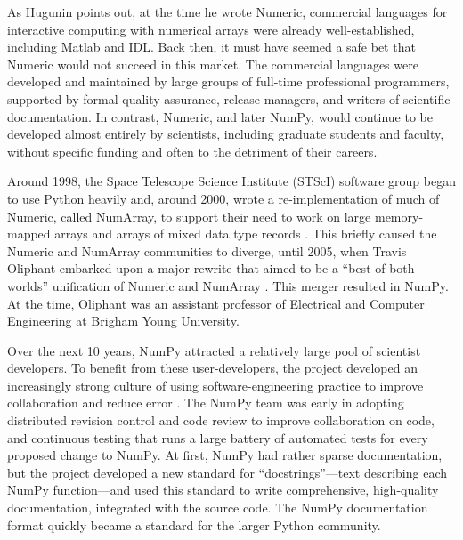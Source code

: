 As Hugunin points out, at the time he wrote Numeric, commercial languages for
interactive computing with numerical arrays were already well-established,
including Matlab and IDL.  Back then, it must have seemed a safe bet that
Numeric would not succeed in this market.  The commercial languages were
developed and maintained by large groups of full-time professional programmers,
supported by formal quality assurance, release managers, and writers of
scientific documentation.  In contrast, Numeric, and later NumPy, would
continue to be developed almost entirely by scientists, including graduate
students and faculty, without specific funding and often to the detriment of their careers.



Around 1998, the Space Telescope Science Institute (STScI) software group began
to use Python heavily and, around 2000, wrote a re-implementation of much of
Numeric, called NumArray, to support their need to work on large memory-mapped
arrays and arrays of mixed data type records \cite{STScI-slither}.  This
briefly caused the Numeric and NumArray communities to diverge, until 2005,
when Travis Oliphant embarked upon a major rewrite that aimed to be a ``best of
both worlds'' unification of Numeric and NumArray \cite{oliphant2006guide}.
This merger resulted in NumPy.  At the time, Oliphant was an assistant
professor of Electrical and Computer Engineering at Brigham Young University.

Over the next 10 years, NumPy attracted a relatively large pool of scientist
developers.  To benefit from these
user-developers, the project developed an increasingly strong culture of using
software-engineering practice to improve collaboration and reduce error
\cite{millman2014developing}. The NumPy team was early in adopting distributed
revision control and code review to improve collaboration on code, and
continuous testing that runs a large battery of automated tests for every proposed
change to NumPy. At first, NumPy had rather sparse documentation, but the project
developed a new standard for ``docstrings''---text describing each NumPy
function---and used this standard to write comprehensive, high-quality
documentation, integrated with the source code\cite{vanderwalt2008scipy,harrington2008scipy,harrington2009scipy}. The NumPy documentation format
quickly became a standard for the larger Python community.

